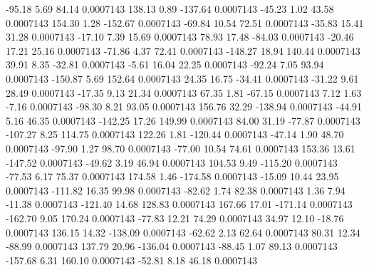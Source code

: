       -95.18        5.69       84.14     0.0007143
      138.13        0.89     -137.64     0.0007143
      -45.23        1.02       43.58     0.0007143
      154.30        1.28     -152.67     0.0007143
      -69.84       10.54       72.51     0.0007143
      -35.83       15.41       31.28     0.0007143
      -17.10        7.39       15.69     0.0007143
       78.93       17.48      -84.03     0.0007143
      -20.46       17.21       25.16     0.0007143
      -71.86        4.37       72.41     0.0007143
     -148.27       18.94      140.44     0.0007143
       39.91        8.35      -32.81     0.0007143
       -5.61       16.04       22.25     0.0007143
      -92.24        7.05       93.94     0.0007143
     -150.87        5.69      152.64     0.0007143
       24.35       16.75      -34.41     0.0007143
      -31.22        9.61       28.49     0.0007143
      -17.35        9.13       21.34     0.0007143
       67.35        1.81      -67.15     0.0007143
        7.12        1.63       -7.16     0.0007143
      -98.30        8.21       93.05     0.0007143
      156.76       32.29     -138.94     0.0007143
      -44.91        5.16       46.35     0.0007143
     -142.25       17.26      149.99     0.0007143
       84.00       31.19      -77.87     0.0007143
     -107.27        8.25      114.75     0.0007143
      122.26        1.81     -120.44     0.0007143
      -47.14        1.90       48.70     0.0007143
      -97.90        1.27       98.70     0.0007143
      -77.00       10.54       74.61     0.0007143
      153.36       13.61     -147.52     0.0007143
      -49.62        3.19       46.94     0.0007143
      104.53        9.49     -115.20     0.0007143
      -77.53        6.17       75.37     0.0007143
      174.58        1.46     -174.58     0.0007143
      -15.09       10.44       23.95     0.0007143
     -111.82       16.35       99.98     0.0007143
      -82.62        1.74       82.38     0.0007143
        1.36        7.94      -11.38     0.0007143
     -121.40       14.68      128.83     0.0007143
      167.66       17.01     -171.14     0.0007143
     -162.70        9.05      170.24     0.0007143
      -77.83       12.21       74.29     0.0007143
       34.97       12.10      -18.76     0.0007143
      136.15       14.32     -138.09     0.0007143
      -62.62        2.13       62.64     0.0007143
       80.31       12.34      -88.99     0.0007143
      137.79       20.96     -136.04     0.0007143
      -88.45        1.07       89.13     0.0007143
     -157.68        6.31      160.10     0.0007143
      -52.81        8.18       46.18     0.0007143
